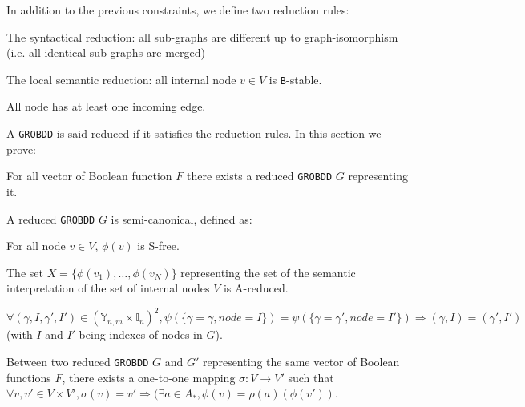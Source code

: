 \documentclass[a4paper,10pt]{article}
\newcommand{\Y}{\mathbb{Y}}
\newcommand{\I}{\mathbb{I}}
\newcommand{\GroBdd}{\texttt{GROBDD}}
\begin{document}
In addition to the previous constraints, we define two reduction rules: \begin{compactenum}
\item The syntactical reduction: all sub-graphs are different up to graph-isomorphism (i.e. all identical sub-graphs are merged)
\item The local semantic reduction: all internal node $v\in V$ is \texttt{B}-stable.
\item All node has at least one incoming edge.
\end{compactenum}
A \GroBdd{} is said reduced if it satisfies the reduction rules.
In this section we prove: \begin{compactenum}
\item For all vector of Boolean function $F$ there exists a reduced \GroBdd{} $G$ representing it.
\item A reduced \GroBdd{} $G$ is semi-canonical, defined as: \begin{compactenum}
\item For all node $v\in V$, $\phi(v)$ is S-free.
\item The set $X = \{\phi(v_1), \dots, \phi(v_N)\}$ representing the set of the semantic interpretation of the set of internal nodes $V$ is A-reduced.
\item $\forall (\gamma, I, \gamma', I') \in (\Y_{n, m} \times \I_n)^2, \psi(\{\gamma = \gamma, node = I\}) = \psi(\{\gamma = \gamma', node = I'\}) \Rightarrow (\gamma, I) = (\gamma', I')$ (with $I$ and $I'$ being indexes of nodes in $G$).
\end{compactenum}
\item Between two reduced \GroBdd{} $G$ and $G'$ representing the same vector of Boolean functions $F$, there exists a one-to-one mapping $\sigma: V \longrightarrow V'$ such that $\forall v, v' \in V \times V', \sigma(v) = v' \Rightarrow (\exists a \in A_{*}, \phi(v) = \rho(a)(\phi(v'))$.
\end{compactenum}
\end{document}
